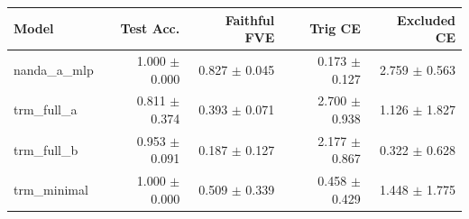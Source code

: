 \begin{tabular}{lrrrr}
\toprule
Model & Test Acc. & Faithful FVE & Trig CE & Excluded CE \\
\midrule
nanda\_a\_mlp & 1.000 $\pm$ 0.000 & 0.827 $\pm$ 0.045 & 0.173 $\pm$ 0.127 & 2.759 $\pm$ 0.563 \\
trm\_full\_a & 0.811 $\pm$ 0.374 & 0.393 $\pm$ 0.071 & 2.700 $\pm$ 0.938 & 1.126 $\pm$ 1.827 \\
trm\_full\_b & 0.953 $\pm$ 0.091 & 0.187 $\pm$ 0.127 & 2.177 $\pm$ 0.867 & 0.322 $\pm$ 0.628 \\
trm\_minimal & 1.000 $\pm$ 0.000 & 0.509 $\pm$ 0.339 & 0.458 $\pm$ 0.429 & 1.448 $\pm$ 1.775 \\
\bottomrule
\end{tabular}
